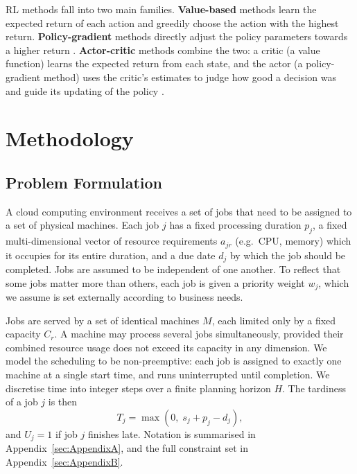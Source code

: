 \documentclass[12pt]{article}
\begin{document}
RL methods fall into two main families. \textbf{Value-based} methods learn the expected return of each action and greedily choose the action with the highest return. \textbf{Policy-gradient} methods directly adjust the policy parameters towards a higher return \cite{williams1992reinforce}. \textbf{Actor-critic} methods combine the two: a critic (a value function) learns the expected return from each state, and the actor (a policy-gradient method) uses the critic's estimates to judge how good a decision was and guide its updating of the policy \cite{konda1999actorcritic}.

\section{Methodology}
\subsection{Problem Formulation}\label{sec:problem}
A cloud computing environment receives a set of jobs that need to be assigned to a set of physical machines. Each job $j$ has a fixed processing duration $p_j$, a fixed multi-dimensional vector of resource requirements $a_{jr}$ (e.g.\ CPU, memory) which it occupies for its entire duration, and a due date $d_j$ by which the job should be completed. Jobs are assumed to be independent of one another. To reflect that some jobs matter more than others, each job is given a priority weight $w_j$, which we assume is set externally according to business needs.

Jobs are served by a set of identical machines $M$, each limited only by a fixed capacity $C_r$. A machine may process several jobs simultaneously, provided their combined resource usage does not exceed its capacity in any dimension. We model the scheduling to be non-preemptive: each job is assigned to exactly one machine at a single start time, and runs uninterrupted until completion. We discretise time into integer steps over a finite planning horizon $H$. The tardiness of a job $j$ is then
\begin{equation}\label{eq:tardiness}
    T_j = \max\left(0,\; s_j + p_j - d_j\right),
\end{equation}
and $U_j = 1$ if job $j$ finishes late. Notation is summarised in Appendix~\ref{sec:AppendixA}, and the full constraint set in Appendix~\ref{sec:AppendixB}.
\end{document}
